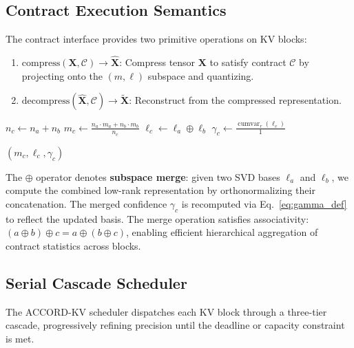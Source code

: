 \documentclass[11pt, a4paper, oneside]{article}
\theoremstyle{myplain}
\theoremstyle{mydefinition}
\theoremstyle{myremark}
\DeclareMathOperator{\cumvar}{cumvar}
\begin{document}
\subsection{Contract Execution Semantics}
\label{sec:contract_exec}

The contract interface provides two primitive operations on KV blocks:

\begin{enumerate}
    \item $\text{compress}(\mathbf{X}, \mathcal{C}) \rightarrow \hat{\mathbf{X}}$: Compress tensor $\mathbf{X}$ to satisfy contract $\mathcal{C}$ by projecting onto the $(m, \ell)$ subspace and quantizing.
    \item $\text{decompress}(\hat{\mathbf{X}}, \mathcal{C}) \rightarrow \tilde{\mathbf{X}}$: Reconstruct from the compressed representation.
\end{enumerate}

\begin{algorithm}[t]
    \caption{merge\_stats: Merge two AttentionContract statistics}

    $n_c \leftarrow n_a + n_b$ \;
    $m_c \leftarrow \frac{n_a \cdot m_a + n_b \cdot m_b}{n_c}$ 
    $\ell_c \leftarrow \ell_a \oplus \ell_b$ 
    $\gamma_c \leftarrow \frac{\cumvar_r(\ell_c)}{1}$ 

    \Return $(m_c, \ell_c, \gamma_c)$
    \label{algo:merge_stats}
\end{algorithm}

The $\oplus$ operator denotes \textbf{subspace merge}: given two SVD bases $\ell_a$ and $\ell_b$, we compute the combined low-rank representation by orthonormalizing their concatenation. The merged confidence $\gamma_c$ is recomputed via Eq.\ \eqref{eq:gamma_def} to reflect the updated basis. The merge operation satisfies associativity: $(a \oplus b) \oplus c = a \oplus (b \oplus c)$, enabling efficient hierarchical aggregation of contract statistics across blocks.

\subsection{Serial Cascade Scheduler}
\label{sec:scheduler}

The ACCORD-KV scheduler dispatches each KV block through a three-tier cascade, progressively refining precision until the deadline or capacity constraint is met.
\end{document}
